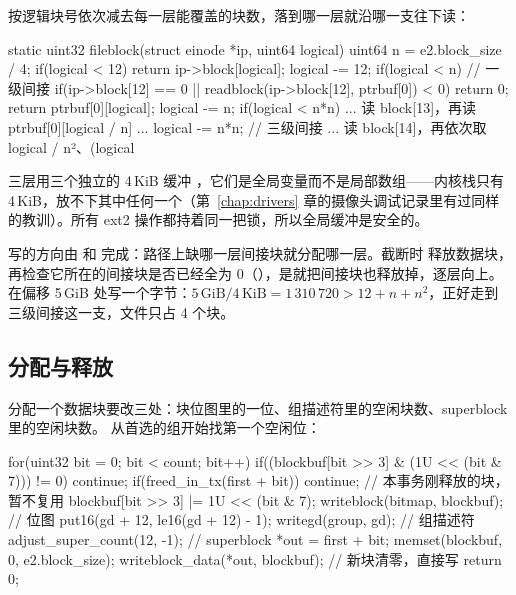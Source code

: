 按逻辑块号依次减去每一层能覆盖的块数，落到哪一层就沿哪一支往下读：

\begin{ccode}
static uint32 fileblock(struct einode *ip, uint64 logical) {
  uint64 n = e2.block_size / 4;
  if(logical < 12) return ip->block[logical];
  logical -= 12;
  if(logical < n){                                          // 一级间接
    if(ip->block[12] == 0 || readblock(ip->block[12], ptrbuf[0]) < 0) return 0;
    return ptrbuf[0][logical];
  }
  logical -= n;
  if(logical < n*n){ ... 读 block[13]，再读 ptrbuf[0][logical / n] ... }
  logical -= n*n;                                           // 三级间接
  ... 读 block[14]，再依次取 logical / n²、(logical %
}
\end{ccode}

三层用三个独立的 4\,KiB 缓冲 ，它们是全局变量而不是局部数组——内核栈只有 4\,KiB，放不下其中任何一个（第~\ref{chap:drivers} 章的摄像头调试记录里有过同样的教训）。所有 ext2 操作都持着同一把锁，所以全局缓冲是安全的。

写的方向由  和  完成：路径上缺哪一层间接块就分配哪一层。截断时  释放数据块，再检查它所在的间接块是否已经全为 0（），是就把间接块也释放掉，逐层向上。 在偏移 5\,GiB 处写一个字节：$5\,\text{GiB}/4\,\text{KiB} = 1\,310\,720 > 12 + n + n^2$，正好走到三级间接这一支，文件只占 4 个块。

\subsection{分配与释放}

分配一个数据块要改三处：块位图里的一位、组描述符里的空闲块数、superblock 里的空闲块数。 从首选的组开始找第一个空闲位：

\begin{ccode}
for(uint32 bit = 0; bit < count; bit++){
  if((blockbuf[bit >> 3] & (1U << (bit & 7))) != 0) continue;
  if(freed_in_tx(first + bit)) continue;        // 本事务刚释放的块，暂不复用
  blockbuf[bit >> 3] |= 1U << (bit & 7);
  writeblock(bitmap, blockbuf);                 // 位图
  put16(gd + 12, le16(gd + 12) - 1);
  writegd(group, gd);                           // 组描述符
  adjust_super_count(12, -1);                   // superblock
  *out = first + bit;
  memset(blockbuf, 0, e2.block_size);
  writeblock_data(*out, blockbuf);              // 新块清零，直接写
  return 0;
}
\end{ccode}

